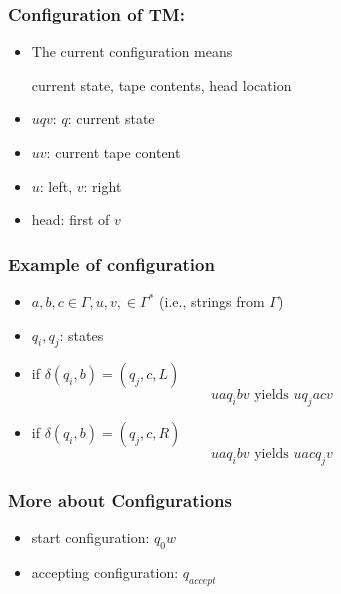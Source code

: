 




\begin{frame}[allowframebreaks] \frametitle{Configuration of TM:}
  \begin{itemize}
  \item The current configuration means
    \begin{center}
    current state, tape contents, head location
\end{center}
\item $uqv$: $q$: current state

\item [] $uv$: current tape content

\item [] $u$: left, $v$: right

\item [] head: first of $v$

\end{itemize}\end{frame} \begin{frame}[allowframebreaks] \frametitle{Example of configuration}
  \begin{itemize}
\item $a,b,c \in \Gamma, u,v, \in \Gamma^*$ (i.e., strings from
$\Gamma$)

\item [] $q_i, q_j$: states

\item if $\delta(q_i,b) =(q_j, c, L)$
  \begin{equation*}
uaq_i bv \mbox{ yields } uq_j a cv
  \end{equation*}
\item if $\delta(q_i,b) = (q_j, c, R)$
  \begin{equation*}
    uaq_i bv \mbox{ yields } uacq_j v
  \end{equation*}
\end{itemize}\end{frame} \begin{frame}[allowframebreaks] \frametitle{More about Configurations}
  \begin{itemize}
\item start configuration: $q_0 w$
\item accepting configuration: $q_{accept}$


\end{itemize}
\end{frame}
